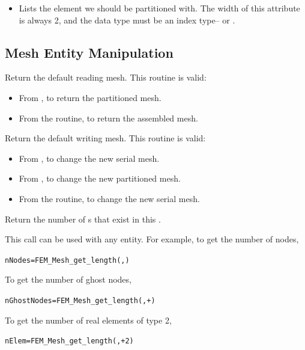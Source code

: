 \begin{itemize}
\item {} Lists the element we should be partitioned with.
    The width of this attribute is always 2, and the data type must
    be an index type-- or .
\end{itemize}



\subsection{Mesh Entity Manipulation}



Return the default reading mesh.  This routine is valid:

\begin{itemize}
\item From , to return the partitioned mesh.
\item From the  routine, to return the assembled mesh.
\end{itemize}


Return the default writing mesh.  This routine is valid:

\begin{itemize}
\item From , to change the new serial mesh.
\item From , to change the new partitioned mesh.
\item From the  routine, to change the new serial mesh.
\end{itemize}



Return the number of s that exist in this .

This call can be used with any entity.
For example, to get the number of nodes,
  \begin{alltt}
      nNodes=FEM\_Mesh\_get\_length(,)
  \end{alltt}
To get the number of ghost nodes, 
  \begin{alltt}
      nGhostNodes=FEM\_Mesh\_get\_length(,+)
  \end{alltt}
To get the number of real elements of type 2,
  \begin{alltt}
  	nElem=FEM\_Mesh\_get\_length(,+2)
  \end{alltt}


